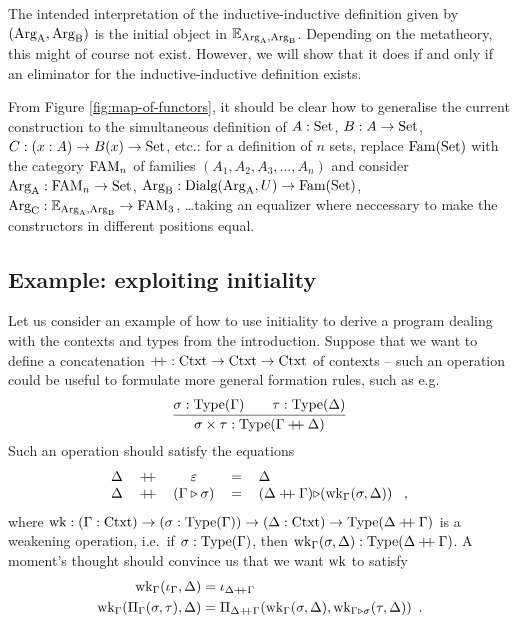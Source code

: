 \documentclass[orivec,envcountsame, ,envcountsect]{llncs}
\begin{document}
\begin{remark}
  The intended interpretation of the inductive-inductive definition
  given by $(\text{Arg}_{\text{A}}, \text{Arg}_{\text{B}})$ is the initial object in
  $\mathbb{E}_{\text{Arg}_{\text{A}}, \text{Arg}_{\text{B}}}$. Depending on the metatheory, this might of
  course not exist. However, we will show that it does if and only if
  an eliminator for the inductive-inductive definition exists.
\end{remark}

\begin{remark} %
  From Figure \ref{fig:map-of-functors}, it should be clear how to
  generalise the current construction to the simultaneous definition
  of $A : \text{Set}$, $B : A \to \text{Set}$, $C : {(x : A)} \to B(x) \to \text{Set}$,
  etc.: for a definition of $n$ sets, replace $\text{Fam}(\text{Set})$ with the category $\text{FAM}_n$ of families $(A_1, A_2, A_3, \ldots, A_n)$ and
  consider $\text{Arg}_{\text{A}} : \text{FAM}_n \to \text{Set}$, $\text{Arg}_{\text{B}} : \text{Dialg}(\text{Arg}_{\text{A}}, U) \to
  \text{Fam}(\text{Set})$, $\text{Arg}_{\text{C}} : \mathbb{E}_{\text{Arg}_{\text{A}}, \text{Arg}_{\text{B}}} \to \text{FAM}_3$, \ldots taking an
  equalizer where neccessary to make the constructors in different
  positions equal.
\end{remark}

\subsection{Example: exploiting initiality}
\label{sec:exploit-init}

Let us consider an example of how to use initiality to
derive %
a program dealing with the contexts and types from the introduction.
Suppose that we want to define a concatenation $\mathbin{+\mkern-6mu+} : \text{Ctxt}
\to \text{Ctxt} \to \text{Ctxt}$ of contexts -- such an operation could be useful
to formulate more general
formation rules, such as e.g.\
\[
\infer{\sigma \times \tau : \Type(\Gamma \concatCtxt \Delta)}{\sigma : \Type(\Gamma) \quad & \tau : \Type(\Delta)}
\]
Such an operation should satisfy the equations
\[
\begin{tabular}{lcccl}
  $\Delta$ & $\concatCtxt$ & $\emptyCtxt$ & $=$ & $\Delta$ \\
  $\Delta$ & $\concatCtxt$ & $(\consCtxt{\Gamma}{\sigma})$ & $=$ & $\consCtxt{(\Delta \concatCtxt \Gamma)}{$(\wkapp{\Gamma}{\Delta}{\sigma})$}$ \enspace ,
\end{tabular}
\]
where $\text{wk} : (\Gamma : \text{Ctxt}) \to (\sigma : \text{Type}(\Gamma)) \to (\Delta
: \text{Ctxt}) \to \text{Type}(\Delta \mathbin{+\mkern-6mu+} \Gamma)$ is a weakening
operation, i.e.\ if $\sigma : \text{Type}(\Gamma)$, then
$\text{wk}_{\Gamma}(\sigma, \Delta) : \text{Type}(\Delta \mathbin{+\mkern-6mu+} \Gamma)$. A
moment's thought should convince us that we want $\text{wk}$ to satisfy
\begin{align*}
  \text{wk}_{\Gamma}(\iota_{\Gamma}, \Delta) &= \iota_{\Delta \mathbin{+\mkern-6mu+} \Gamma} \\
  \text{wk}_{\Gamma}(\Pi_{\Gamma}(\sigma, \tau), \Delta) &= \Pi_{\Delta \mathbin{+\mkern-6mu+} \Gamma}(\text{wk}_{\Gamma}(\sigma, \Delta), \text{wk}_{\Gamma \triangleright \sigma}(\tau, \Delta)) \enspace .
\end{align*}
\end{document}
